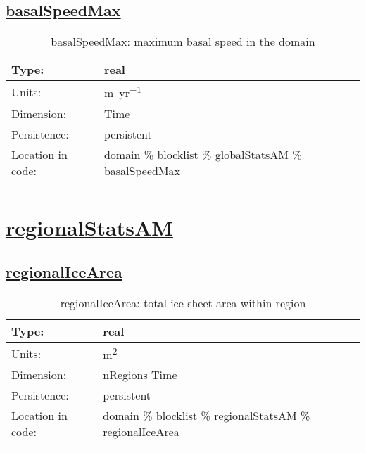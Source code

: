 \subsection[basalSpeedMax]{\hyperref[sec:var_tab_globalStatsAM]{basalSpeedMax}}
\label{subsec:var_sec_globalStatsAM_basalSpeedMax}
\begin{center}
\begin{longtable}{| p{2.0in} | p{4.0in} |}
        \hline 
        Type: & real \\
        \hline 
        Units: & \si{m.yr^{-1}} \\
        \hline 
        Dimension: & Time \\
        \hline 
        Persistence: & persistent \\
        \hline 
         Location in code: & domain \% blocklist \% globalStatsAM \% basalSpeedMax \\
         \hline 
    \caption{basalSpeedMax: maximum basal speed in the domain}
\end{longtable}
\end{center}
\section[regionalStatsAM]{\hyperref[sec:var_tab_regionalStatsAM]{regionalStatsAM}}
\label{sec:var_sec_regionalStatsAM}
\subsection[regionalIceArea]{\hyperref[sec:var_tab_regionalStatsAM]{regionalIceArea}}
\label{subsec:var_sec_regionalStatsAM_regionalIceArea}
\begin{center}
\begin{longtable}{| p{2.0in} | p{4.0in} |}
        \hline 
        Type: & real \\
        \hline 
        Units: & \si{m^2} \\
        \hline 
        Dimension: & nRegions Time \\
        \hline 
        Persistence: & persistent \\
        \hline 
         Location in code: & domain \% blocklist \% regionalStatsAM \% regionalIceArea \\
         \hline 
    \caption{regionalIceArea: total ice sheet area within region}
\end{longtable}
\end{center}
